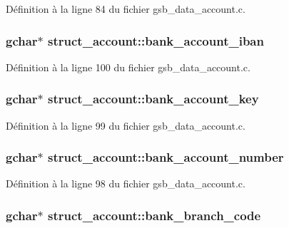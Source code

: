 Définition à la ligne 84 du fichier gsb\_\-data\_\-account.c.

\subsubsection[{bank\_\-account\_\-iban}]{\setlength{\rightskip}{0pt plus 5cm}gchar$\ast$ {\bf struct\_\-account::bank\_\-account\_\-iban}}\label{structstruct__account_a1bd460f9c386390ea0f56d1a17b32318}


Définition à la ligne 100 du fichier gsb\_\-data\_\-account.c.

\subsubsection[{bank\_\-account\_\-key}]{\setlength{\rightskip}{0pt plus 5cm}gchar$\ast$ {\bf struct\_\-account::bank\_\-account\_\-key}}\label{structstruct__account_a0517d77c308d437101f8db2eae8e05f8}


Définition à la ligne 99 du fichier gsb\_\-data\_\-account.c.

\subsubsection[{bank\_\-account\_\-number}]{\setlength{\rightskip}{0pt plus 5cm}gchar$\ast$ {\bf struct\_\-account::bank\_\-account\_\-number}}\label{structstruct__account_a069c11b0f1e8d5ea27ff9bd75e253eb9}


Définition à la ligne 98 du fichier gsb\_\-data\_\-account.c.

\subsubsection[{bank\_\-branch\_\-code}]{\setlength{\rightskip}{0pt plus 5cm}gchar$\ast$ {\bf struct\_\-account::bank\_\-branch\_\-code}}\label{structstruct__account_a42e1c15a6d29432ecd74d5014f399caa}


